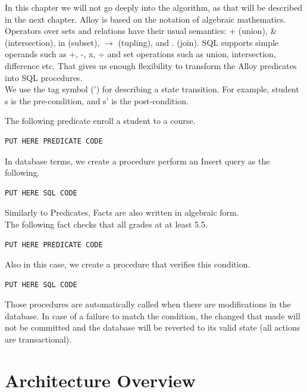 \documentclass[oneside]{book}
\begin{document}
In this chapter we will not go deeply into the algorithm, as that will be described in the next chapter. Alloy is based on the notation of algebraic mathematics. Operators over sets and relations have their usual semantics: + (union), \& (intersection), in (subset), $\rightarrow$ (tupling), and . (join). SQL supports simple operands such as +, -, x, ÷ and set operations such as union, intersection, difference etc. That gives us enough flexibility to transform the Alloy predicates into SQL procedures.\cite{sqlalgebra}\\

We use the tag symbol (') for describing a state transition. For example, student s is the pre-condition, and s' is the post-condition.

The following predicate enroll a student to a course. 
\begin{lstlisting}
PUT HERE PREDICATE CODE
\end{lstlisting}

In database terms, we create a procedure perform an Insert query as the following.
\begin{lstlisting}
PUT HERE SQL CODE
\end{lstlisting}

Similarly to Predicates, Facts are also written in algebraic form.\\

The following fact checks that all grades at at least 5.5.
\begin{lstlisting}
PUT HERE PREDICATE CODE
\end{lstlisting}

Also in this case, we create a procedure that verifies this condition. 

\begin{lstlisting}
PUT HERE SQL CODE
\end{lstlisting}

Those procedures are automatically called when there are modifications in the database. In case of a failure to match the condition, the changed that made will not be committed and the database will be reverted to its valid state (all actions are transactional).\\

\section{Architecture Overview}
\end{document}
